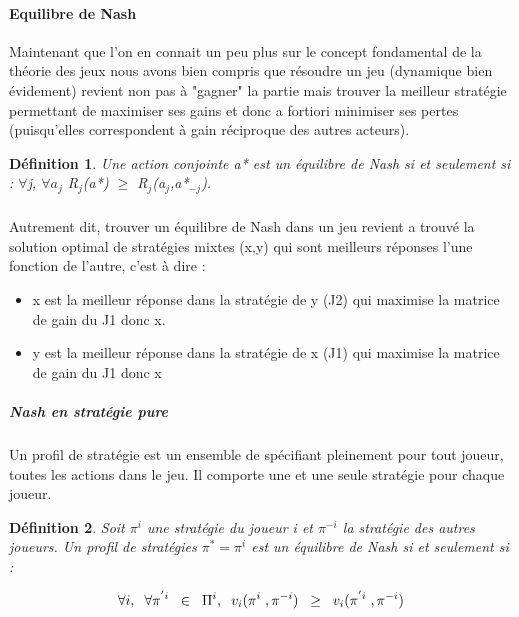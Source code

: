 \documentclass[a4paper, 12pt, twoside]{article}
\newtheorem{definition}{Définition}
\begin{document}
\paragraph{Equilibre de Nash}
{Maintenant que l'on en connait un peu plus sur le concept fondamental de la \textsf{théorie des jeux} nous avons bien compris que résoudre un jeu (dynamique bien évidement) revient non pas à "gagner" la partie mais trouver la meilleur stratégie permettant de maximiser ses gains et donc a fortiori minimiser ses pertes (puisqu'elles correspondent à gain réciproque des autres acteurs).} 

\begin{definition}
Une action conjointe a* est un équilibre de Nash si et seulement si : $ \forall $j, $ \forall a_{j}$ R$ _{j} $(a*) $ \geq $ R$ _{j} $(a$ _{j} $,a*$ _{-j} $).
\end{definition}


\subparagraph*{}{Autrement dit, trouver \textsf{un équilibre de Nash} dans un jeu revient a trouvé la solution optimal de stratégies mixtes (x,y) qui sont meilleurs réponses l'une fonction de l'autre, c'est à dire :}
\begin{itemize}
\item x est la meilleur réponse dans la stratégie de y (J2) qui maximise la matrice de gain du J1 donc x.
\item y est la meilleur réponse dans la stratégie de x (J1) qui maximise la matrice de gain du J1  donc x
\end{itemize}  


\subparagraph{Nash en stratégie pure}{Un profil de stratégie est un ensemble de spécifiant pleinement pour tout joueur, toutes les actions dans le jeu. Il comporte une et une seule stratégie pour chaque joueur.}
\begin{definition}
Soit $\pi^{i} $ une stratégie du joueur i et $ \pi^{-i} $ la stratégie des autres joueurs. Un profil de stratégies $\pi^{*} = \pi^{i}$ est un équilibre de Nash si et seulement si :
\end{definition}
\begin{align*}
\forall i, \hspace{0,2 cm} \forall \pi^{'i} \hspace{0,2 cm} \in \hspace{0,2 cm} \Pi^{i}, \hspace{0,2 cm} v_{i}(\pi^{i}\hspace{0,1 cm}, \pi^{-i}) \hspace{0,2 cm} \geq \hspace{0,2 cm} v_{i}(\pi^{'i}\hspace{0,1 cm}, \pi^{-i})
\end{align*}
\end{document}
